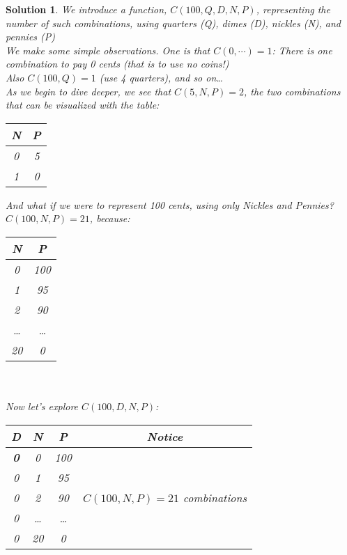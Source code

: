 \documentclass{article}
\newtheorem*{solution*}{Solution}
\begin{document}
\begin{solution*}
    We introduce a function, $C(100, Q, D, N, P)$,
    representing the number of such combinations,
    using quarters (Q), dimes (D), nickles (N), and pennies (P)\\

    We make some simple observations. One is that $C(0,\cdots)=1$: 
    There is one combination to pay 0 cents (that is to use no coins!)\\
    
    Also $C(100,Q)=1$ (use 4 quarters), and so on\dots\\

    As we begin to dive deeper, we see that $C(5, N, P)=2$, the
    two combinations that can be visualized with the table:\\

    \begin{tabular}{|c|c|}
        \hline
        N & P \\
        \hline
        0 & 5\\
        \hline
        1 & 0\\
        \hline
    \end{tabular}

    \newpage
    And what if we were to represent 100 cents, 
    using only Nickles and Pennies? $C(100, N, P)=21$, because:\\

    \begin{tabular}{|c|c|}
        \hline
        N & P \\
        \hline
        0 & 100\\
        \hline
        1 & 95\\
        \hline
        2 & 90\\
        \hline
        \dots & \dots\\
        \hline
        20 & 0\\
        \hline
    \end{tabular}\\\\  

    Now let's explore $C(100, D, N, P)$:\\

    \begin{tabular}{|c|c|c|c|}
        \toprule
        D & N & P & Notice\\
        \hline
        \textbf{0} & 0 & 100 & \multirow{5}{*}{{
            $C(100, N, P)=21$ combinations
        }} \\
        \cline{1-3}
        0 & 1 & 95 & \\
        \cline{1-3}
        0 & 2 & 90 & \\
        \cline{1-3}
        0 & \dots & \dots & \\
        \cline{1-3}
        0 & 20 & 0 & \\


\end{tabular}
\end{solution*}
\end{document}
